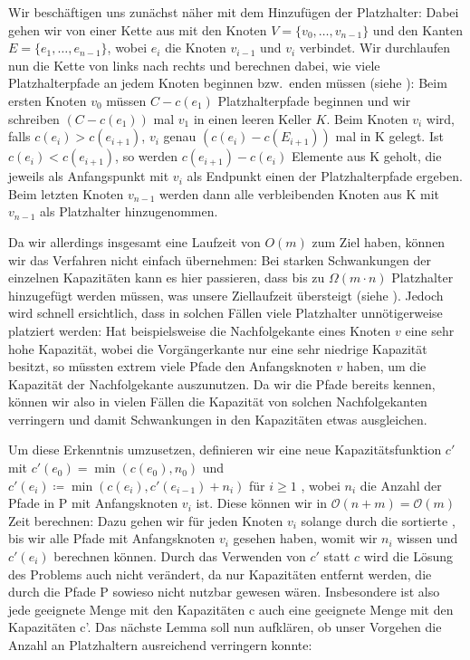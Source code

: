 Wir beschäftigen uns zunächst näher mit dem Hinzufügen der Platzhalter:
Dabei gehen wir von einer Kette aus mit den Knoten $V=\{v_0,\dots,v_{n-1}\}$ und den Kanten
$E=\{e_1,\dots,e_{n-1}\}$, wobei $e_i$ die Knoten $v_{i-1}$ und $v_i$ verbindet.
Wir durchlaufen nun die Kette von links nach rechts und berechnen dabei, wie viele Platzhalterpfade an jedem Knoten
beginnen bzw.\ enden müssen (siehe ):
Beim ersten Knoten $v_0$ müssen $C - c(e_1)$ Platzhalterpfade beginnen und wir schreiben $(C - c(e_1))$ mal $v_1$ in einen
leeren Keller $K$.
Beim Knoten $v_i$ wird, falls $c(e_i) > c(e_{i+1})$, $v_i$ genau $(c(e_i) - c(E_{i+1}))$ mal in K gelegt.
Ist $c(e_i) < c(e_{i+1})$, so werden $c(e_{i+1}) - c(e_i)$ Elemente aus K geholt, die jeweils als Anfangspunkt mit $v_i$
als Endpunkt einen der Platzhalterpfade ergeben.
Beim letzten Knoten $v_{n-1}$ werden dann alle verbleibenden Knoten aus K mit $v_{n-1}$ als Platzhalter hinzugenommen.

Da wir allerdings insgesamt eine Laufzeit von $O(m)$ zum Ziel haben, können wir das  Verfahren
nicht einfach übernehmen:
Bei starken Schwankungen der einzelnen Kapazitäten kann es hier passieren, dass bis zu $\Omega(m\cdot n)$
Platzhalter hinzugefügt werden müssen, was unsere Ziellaufzeit übersteigt (siehe ).
Jedoch wird schnell ersichtlich, dass in solchen Fällen viele Platzhalter unnötigerweise platziert werden:
Hat beispielsweise die Nachfolgekante eines Knoten $v$ eine sehr hohe Kapazität, wobei die Vorgängerkante nur eine sehr
niedrige Kapazität besitzt, so müssten extrem viele Pfade den Anfangsknoten $v$ haben, um die Kapazität der
Nachfolgekante auszunutzen.
Da wir die Pfade bereits kennen, können wir also in vielen Fällen die Kapazität von solchen Nachfolgekanten verringern und
damit Schwankungen in den Kapazitäten etwas ausgleichen.

Um diese Erkenntnis umzusetzen, definieren wir eine neue Kapazitätsfunktion $c'$ mit $c'(e_0) = \min(c(e_0), n_0)$ und
$ c'(e_i) \coloneqq \min(c(e_i), c'(e_{i-1}) + n_i)$ für $i \geq 1$ , wobei $n_i$ die Anzahl der Pfade in P mit
Anfangsknoten $v_i$ ist.
Diese können wir in $\mathcal O(n + m) = \mathcal O(m)$ Zeit berechnen: Dazu gehen wir für jeden Knoten $v_i$ solange durch die sortierte
, bis wir alle Pfade mit Anfangsknoten $v_i$ gesehen haben, womit wir
$n_i$ wissen und $c'(e_i)$ berechnen können.
Durch das Verwenden von $c'$ statt $c$ wird die Lösung des Problems auch nicht verändert, da nur Kapazitäten entfernt
werden, die durch die Pfade P sowieso nicht nutzbar gewesen wären.
Insbesondere ist also jede geeignete Menge mit den Kapazitäten c auch eine geeignete Menge mit den Kapazitäten c'.
Das nächste Lemma soll nun aufklären, ob unser Vorgehen die Anzahl an Platzhaltern ausreichend verringern konnte:

